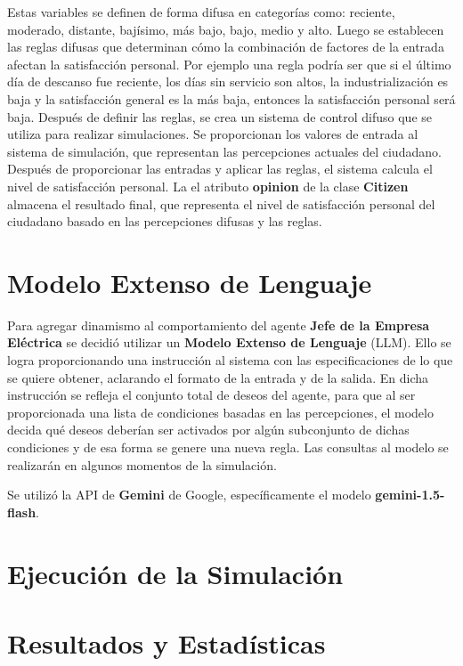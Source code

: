 \documentclass[twocolumn, fontsize=10pt]{article}
\begin{document}
Estas variables se definen de forma difusa en categorías como: reciente, moderado, 
distante, bajísimo, más bajo, bajo, medio y alto. Luego se 
establecen las reglas difusas que determinan cómo la combinación 
de factores de la entrada afectan la satisfacción personal. 
Por ejemplo una regla podría ser que si el último día de 
descanso fue reciente, los días sin servicio son altos, la 
industrialización es baja y la satisfacción general es la más 
baja, entonces la satisfacción personal será baja. Después de 
definir las reglas, se crea un sistema de control difuso que se 
utiliza para realizar simulaciones. Se proporcionan los valores 
de entrada al sistema de simulación, que representan las 
percepciones actuales del ciudadano. Después de proporcionar 
las entradas y aplicar las reglas, el sistema calcula el nivel 
de satisfacción personal. La el atributo \textbf{opinion} de la clase \textbf{Citizen} 
almacena el resultado final, que representa el nivel de satisfacción 
personal del ciudadano basado en las percepciones difusas y 
las reglas.

\section{Modelo Extenso de Lenguaje}

Para agregar dinamismo al comportamiento del agente \textbf{Jefe de la Empresa Eléctrica}
se decidió utilizar un \textbf{Modelo Extenso de Lenguaje} (LLM). Ello se logra proporcionando 
una instrucción al sistema con las especificaciones de lo que se quiere obtener, aclarando 
el formato de la entrada y de la salida. En dicha instrucción se refleja el conjunto total de deseos
del agente, para que al ser proporcionada una lista de condiciones basadas en las percepciones, el modelo decida 
qué deseos deberían ser activados por algún subconjunto de dichas condiciones y de esa forma se genere una nueva regla.
Las consultas al modelo se realizarán en algunos momentos de la simulación.

Se utilizó la API de \textbf{Gemini} de Google, específicamente el modelo \textbf{gemini-1.5-flash}.

\section{Ejecución de la Simulación}

\section{Resultados y Estadísticas}
\end{document}
